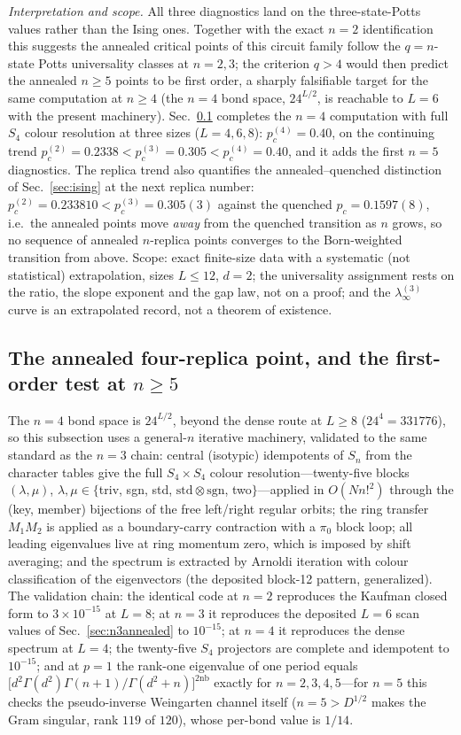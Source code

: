 \documentclass[aps,prx,reprint,superscriptaddress,nobibnotes,longbibliography]{revtex4-2}
\theoremstyle{remark}
\begin{document}
\emph{Interpretation and scope.}  All three diagnostics land on the three-state-Potts values rather than the Ising ones.  Together with the exact $n=2$ identification this suggests the annealed critical points of this circuit family follow the $q=n$-state Potts universality classes at $n=2,3$; the criterion $q>4$ would then predict the annealed $n\ge5$ points to be first order, a sharply falsifiable target for the same computation at $n\ge4$ (the $n=4$ bond space, $24^{L/2}$, is reachable to $L=6$ with the present machinery).  Sec.~\ref{sec:n4n5} completes the $n=4$ computation with full $S_4$ colour resolution at three sizes ($L=4,6,8$): $p_c^{(4)}=0.40$, on the continuing trend $p_c^{(2)}=0.2338<p_c^{(3)}=0.305<p_c^{(4)}=0.40$, and it adds the first $n=5$ diagnostics.  The replica trend also quantifies the annealed--quenched distinction of Sec.~\ref{sec:ising} at the next replica number: $p_c^{(2)}=0.233810<p_c^{(3)}=0.305(3)$ against the quenched $p_c=0.1597(8)$, i.e.\ the annealed points move \emph{away} from the quenched transition as $n$ grows, so no sequence of annealed $n$-replica points converges to the Born-weighted transition from above.  Scope: exact finite-size data with a systematic (not statistical) extrapolation, sizes $L\le12$, $d=2$; the universality assignment rests on the ratio, the slope exponent and the gap law, not on a proof; and the $\lambda_\infty^{(3)}$ curve is an extrapolated record, not a theorem of existence.

\subsection{The annealed four-replica point, and the first-order test at $n\ge5$}
\label{sec:n4n5}

The $n=4$ bond space is $24^{L/2}$, beyond the dense route at $L\ge8$ ($24^4=331776$), so this subsection uses a general-$n$ iterative machinery, validated to the same standard as the $n=3$ chain: central (isotypic) idempotents of $S_n$ from the character tables give the full $S_4\times S_4$ colour resolution---twenty-five blocks $(\lambda,\mu)$, $\lambda,\mu\in\{$triv, sgn, std, $\mathrm{std}\otimes\mathrm{sgn}$, two$\}$---applied in $O(Nn!^2)$ through the (key, member) bijections of the free left/right regular orbits; the ring transfer $M_1M_2$ is applied as a boundary-carry contraction with a $\pi_0$ block loop; all leading eigenvalues live at ring momentum zero, which is imposed by shift averaging; and the spectrum is extracted by Arnoldi iteration with colour classification of the eigenvectors (the deposited block-12 pattern, generalized).  The validation chain: the identical code at $n=2$ reproduces the Kaufman closed form to $3\times10^{-15}$ at $L=8$; at $n=3$ it reproduces the deposited $L=6$ scan values of Sec.~\ref{sec:n3annealed} to $10^{-15}$; at $n=4$ it reproduces the dense spectrum at $L=4$; the twenty-five $S_4$ projectors are complete and idempotent to $10^{-15}$; and at $p=1$ the rank-one eigenvalue of one period equals $\bigl[d^2\Gamma(d^2)\Gamma(n{+}1)/\Gamma(d^2{+}n)\bigr]^{2\mathrm{nb}}$ exactly for $n=2,3,4,5$---for $n=5$ this checks the pseudo-inverse Weingarten channel itself ($n=5>D^{1/2}$ makes the Gram singular, rank $119$ of $120$), whose per-bond value is $1/14$.
\end{document}
